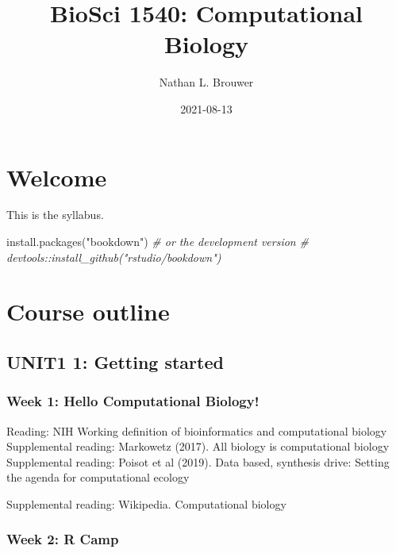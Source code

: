 \documentclass[
]{book}
\title{BioSci 1540: Computational Biology}
\author{Nathan L. Brouwer}
\date{2021-08-13}
\newenvironment{Shaded}{\begin{snugshade}}{\end{snugshade}}
\newcommand{\CommentTok}[1]{\textcolor[rgb]{0.56,0.35,0.01}{\textit{#1}}}
\newcommand{\FunctionTok}[1]{\textcolor[rgb]{0.00,0.00,0.00}{#1}}
\newcommand{\NormalTok}[1]{#1}
\newcommand{\StringTok}[1]{\textcolor[rgb]{0.31,0.60,0.02}{#1}}
\begin{document}
\maketitle

{
\setcounter{tocdepth}{1}
\tableofcontents
}
\hypertarget{welcome}{%
\chapter{Welcome}\label{welcome}}

This is the syllabus.

\begin{Shaded}
\begin{Highlighting}[]
\FunctionTok{install.packages}\NormalTok{(}\StringTok{"bookdown"}\NormalTok{)}
\CommentTok{\# or the development version}
\CommentTok{\# devtools::install\_github("rstudio/bookdown")}
\end{Highlighting}
\end{Shaded}

\hypertarget{course-outline}{%
\chapter{Course outline}\label{course-outline}}

\hypertarget{unit1-1-getting-started}{%
\section{UNIT1 1: Getting started}\label{unit1-1-getting-started}}

\hypertarget{week-1-hello-computational-biology}{%
\subsection{Week 1: Hello Computational Biology!}\label{week-1-hello-computational-biology}}

Reading: NIH Working definition of bioinformatics and computational biology
Supplemental reading: Markowetz (2017). All biology is computational biology
Supplemental reading: Poisot et al (2019). Data based, synthesis drive: Setting the agenda for computational ecology

Supplemental reading: Wikipedia. Computational biology

\hypertarget{week-2-r-camp}{%
\subsection{Week 2: R Camp}\label{week-2-r-camp}}
\end{document}
